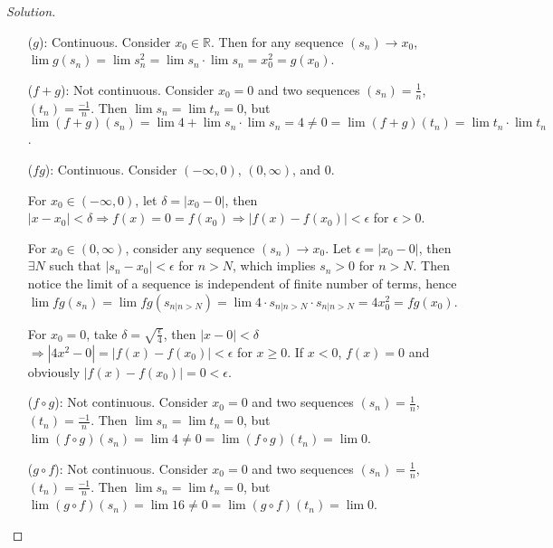 \documentclass{article}
\renewcommand*{\implies}{\ensuremath{\Longrightarrow}}
\newcommand*{\R}{\ensuremath{\mathbb{R}}}
\begin{document}
\begin{enumerate}[label=(\alph*)]
\begin{proof}[Solution]
\begin{enumerate}
            \item [($g$):]
            Continuous. Consider $x_0\in\R$. Then for any sequence $(s_n)\to x_0$, 
            $\lim g(s_n) = \lim s_n^2 = \lim s_n \cdot \lim s_n = x_0^2 = g(x_0)$.

            \item [($f+g$):] Not continuous. Consider $x_0=0$ and two sequences 
            $(s_n)=\frac{1}{n}$, $(t_n)=\frac{-1}{n}$. Then $\lim s_n=\lim t_n=0$, but
            $\lim (f+g)(s_n)=\lim 4 + \lim s_n \cdot \lim s_n = 4\neq 0=\lim (f+g)(t_n) = \lim t_n 
            \cdot \lim t_n$.

            \item [($fg$):] Continuous. Consider $(-\infty,0)$, $(0,\infty)$, and $0$. 
            
            For $x_0\in (-\infty,0)$, let $\delta = |x_0-0|$, then $|x-x_0|<\delta\implies f(x)=0=f(x_0)
            \implies |f(x)-f(x_0)|<\epsilon$ for $\epsilon>0$. 
            
            For $x_0\in (0,\infty)$, consider any sequence $(s_n)\to x_0$. Let $\epsilon = |x_0-0|$, 
            then $\exists N$ such that $|s_n-x_0|<\epsilon$ for $n>N$, which implies $s_n>0$ for 
            $n>N$. Then notice the limit of a sequence is independent of finite number of terms, 
            hence $\lim fg(s_n) = \lim fg(s_{n|n>N}) = \lim 4\cdot s_{n|n>N}\cdot s_{n|n>N} 
            = 4x_0^2 = fg(x_0)$.

            For $x_0 = 0$, take $\delta = \sqrt{\frac{\epsilon}{4}}$, then $|x-0|<\delta$ 
            $\implies |4x^2-0|=|f(x)-f(x_0)|<\epsilon$ for $x\ge 0$. If $x<0$, $f(x)=0$ and 
            obviously $|f(x)-f(x_0)|=0<\epsilon$.

            \item [($f\circ g$):] Not continuous. Consider $x_0=0$ and two sequences
            $(s_n)=\frac{1}{n}$, $(t_n)=\frac{-1}{n}$. Then $\lim s_n=\lim t_n=0$, but
            $\lim (f\circ g)(s_n)=\lim 4\neq 0=\lim (f\circ g)(t_n) = \lim 0$.

            \item [($g\circ f$):] Not continuous. Consider $x_0=0$ and two sequences
            $(s_n)=\frac{1}{n}$, $(t_n)=\frac{-1}{n}$. Then $\lim s_n=\lim t_n=0$, but
            $\lim (g\circ f)(s_n)=\lim 16\neq 0=\lim (g\circ f)(t_n) = \lim 0$.
        \end{enumerate}
        
    \end{proof}
\end{enumerate}
\end{document}
